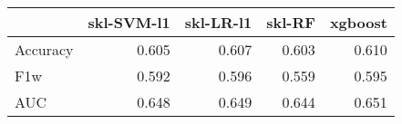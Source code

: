\begin{tabular}{lrrrr}
\toprule
{} &  skl-SVM-l1 &  skl-LR-l1 &  skl-RF &  xgboost \\
\midrule
Accuracy &       0.605 &      0.607 &   0.603 &    0.610 \\
F1w      &       0.592 &      0.596 &   0.559 &    0.595 \\
AUC      &       0.648 &      0.649 &   0.644 &    0.651 \\
\bottomrule
\end{tabular}
